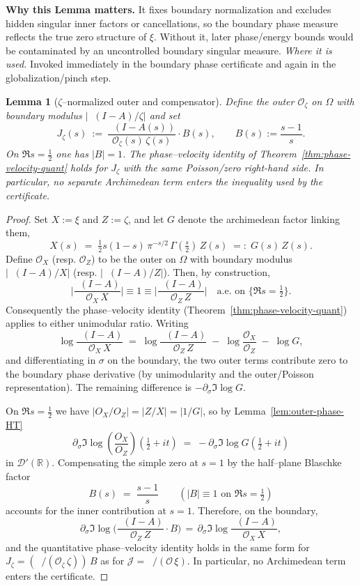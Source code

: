 \documentclass[11pt]{article}
\newtheorem{lemma}{Lemma}[section]
\theoremstyle{definition}
\theoremstyle{remark}
\DeclareMathOperator{\dettwo}{det_2}
\begin{document}
\vspace{1.0cm}
\noindent\textbf{Why this Lemma matters.} It fixes boundary normalization and excludes hidden singular inner factors or cancellations, so the boundary phase measure reflects the true zero structure of $\xi$. Without it, later phase/energy bounds would be contaminated by an uncontrolled boundary singular measure.
\noindent\textit{Where it is used.} Invoked immediately in the boundary phase certificate and again in the globalization/pinch step.
\begin{lemma}[\(\zeta\)–normalized outer and compensator]
\label{lem:zeta-normalization}
Define the outer $\mathcal O_\zeta$ on $\Omega$ with boundary modulus $\big|\dettwo(I-A)/\zeta\big|$ and set
\[ J_\zeta(s)\ :=\ \frac{\dettwo(I-A(s))}{\mathcal O_\zeta(s)\,\zeta(s)}\cdot B(s),\qquad B(s):=\frac{s-1}{s}. \]
On $\Re s=\tfrac12$ one has $|B|=1$. The phase–velocity identity of Theorem~\ref{thm:phase-velocity-quant} holds for $J_\zeta$ with the same Poisson/zero right-hand side. In particular, no separate Archimedean term enters the inequality used by the certificate.
\end{lemma}

\begin{proof}
Set $X:=\xi$ and $Z:=\zeta$, and let $G$ denote the archimedean factor linking them,
\[
  X(s)\;=\;\tfrac12 s(1{-}s)\,\pi^{-s/2}\,\Gamma(\tfrac s2)\,Z(s)\;=:\;G(s)\,Z(s).
\]
Define $\mathcal O_X$ (resp. $\mathcal O_Z$) to be the outer on $\Omega$ with boundary modulus $\big|\dettwo(I{-}A)/X\big|$ (resp. $\big|\dettwo(I{-}A)/Z\big|$). Then, by construction,
\[
  \Big|\frac{\dettwo(I{-}A)}{\mathcal O_X\,X}\Big|\equiv 1\equiv \Big|\frac{\dettwo(I{-}A)}{\mathcal O_Z\,Z}\Big|\quad \text{a.e. on }\{\Re s=\tfrac12\}.
\]
Consequently the phase–velocity identity (Theorem~\ref{thm:phase-velocity-quant}) applies to either unimodular ratio. Writing
\[
  \log \frac{\dettwo(I{-}A)}{\mathcal O_X\,X}
  \;=\; \log \frac{\dettwo(I{-}A)}{\mathcal O_Z\,Z}\; -\; \log\frac{\mathcal O_X}{\mathcal O_Z}\; -\; \log G,
\]
and differentiating in $\sigma$ on the boundary, the two outer terms contribute zero to the boundary phase derivative (by unimodularity and the outer/Poisson representation). The remaining difference is $-\partial_\sigma\Im\log G$.

On $\Re s=\tfrac12$ we have $|O_X/O_Z|=|Z/X|=|1/G|$, so by Lemma~\ref{lem:outer-phase-HT}
\[
  \partial_\sigma\Im\log\!\left(\frac{O_X}{O_Z}\right)(\tfrac12+it)\;=\;-\partial_\sigma\Im\log G(\tfrac12+it)
\]
in $\mathcal D'(\mathbb R)$. Compensating the simple zero at $s=1$ by the half–plane Blaschke factor
\[
  B(s)\;=\;\frac{s-1}{s}\qquad(|B|\equiv 1\text{ on }\Re s=\tfrac12)
\]
accounts for the inner contribution at $s=1$. Therefore, on the boundary,
\[
  \partial_\sigma\Im\log\!\Big(\frac{\dettwo(I{-}A)}{\mathcal O_Z\,Z}\cdot B\Big)
  \,=\, \partial_\sigma\Im\log\frac{\dettwo(I{-}A)}{\mathcal O_X\,X},
\]
and the quantitative phase–velocity identity holds in the same form for $J_\zeta=(\dettwo/(\mathcal O_\zeta\,\zeta))\,B$ as for $\mathcal J=\dettwo/(\mathcal O\,\xi)$. In particular, no Archimedean term enters the certificate.
\end{proof}
\end{document}
